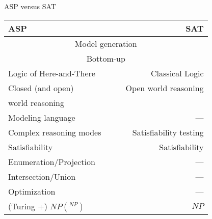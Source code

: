 \begin{frame}[c]{ASP versus SAT}
  \begin{center}\renewcommand{\arraystretch}{1.2}
    \begin{tabular}{lc|cr}
      \alert{ASP}                           &&& \alert{SAT}\\
      \hline\hline
      \multicolumn{4}{c}{Model generation}\\\hline
      \multicolumn{4}{c}{Bottom-up}\\\hline
      Logic of Here-and-There               &&& Classical Logic\\\hline
      Closed (and open)                     &&& Open world reasoning\\[-5pt]
      \qquad world reasoning                &&& \\\hline
      Modeling language                     &&&             ---\\\hline
      Complex reasoning modes               &&& Satisfiability testing\\
      \hspace*{12pt}Satisfiability          &&& Satisfiability\hspace*{12pt}\\[-3pt]
      \hspace*{12pt}Enumeration/Projection  &&& ---\hspace*{12pt}\\[-3pt]
      \hspace*{12pt}Intersection/Union      &&& ---\hspace*{12pt}\\[-3pt]
      \hspace*{12pt}Optimization            &&& ---\hspace*{12pt}\\\hline
      {\footnotesize (Turing +)} $NP(^{NP})$&&& $NP$
    \end{tabular}
  \end{center}
\end{frame}
%

